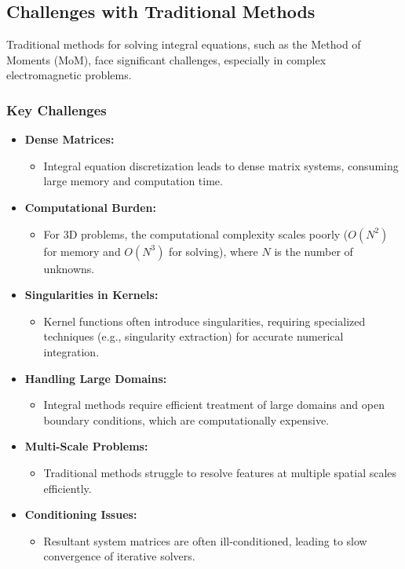 \documentclass[12pt]{article}
\begin{document}
\subsection{Challenges with Traditional Methods}
Traditional methods for solving integral equations, such as the Method of Moments (MoM), face significant challenges, especially in complex electromagnetic problems.

\subsubsection{Key Challenges}
\begin{itemize}
    \item \textbf{Dense Matrices:}
          \begin{itemize}
              \item Integral equation discretization leads to dense matrix systems, consuming large memory and computation time.
          \end{itemize}
    \item \textbf{Computational Burden:}
          \begin{itemize}
              \item For 3D problems, the computational complexity scales poorly (\(O(N^2)\) for memory and \(O(N^3)\) for solving), where \(N\) is the number of unknowns.
          \end{itemize}
    \item \textbf{Singularities in Kernels:}
          \begin{itemize}
              \item Kernel functions often introduce singularities, requiring specialized techniques (e.g., singularity extraction) for accurate numerical integration.
          \end{itemize}
    \item \textbf{Handling Large Domains:}
          \begin{itemize}
              \item Integral methods require efficient treatment of large domains and open boundary conditions, which are computationally expensive.
          \end{itemize}
    \item \textbf{Multi-Scale Problems:}
          \begin{itemize}
              \item Traditional methods struggle to resolve features at multiple spatial scales efficiently.
          \end{itemize}
    \item \textbf{Conditioning Issues:}
          \begin{itemize}
              \item Resultant system matrices are often ill-conditioned, leading to slow convergence of iterative solvers.
          \end{itemize}
\end{itemize}
\end{document}
